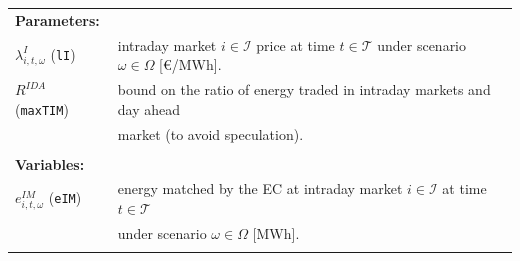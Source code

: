 \begin{tabularx}{\textwidth}{l X}
    
    \textbf{Parameters:} \\
    	$\lambda^I_{i, t, \omega}$ (\texttt{lI}) & intraday market $i \in \mathcal{I}$ price at time $t \in \mathcal{T}$ under scenario $\omega \in \Omega$ [\euro/MWh]. \\
	$R^{IDA}$ (\texttt{maxTIM}) & bound on the ratio of energy traded in intraday markets and day ahead \\
	& market (to avoid speculation).\\
    \\ 
       
    \textbf{Variables:} \\
    $e^{IM}_{i, t, \omega}$ (\texttt{eIM}) & energy matched by the EC at intraday market $i \in \mathcal{I}$ at time $t \in \mathcal{T}$ \\
    & under scenario $\omega \in \Omega$ [MWh]. \\
	\\
\end{tabularx}


